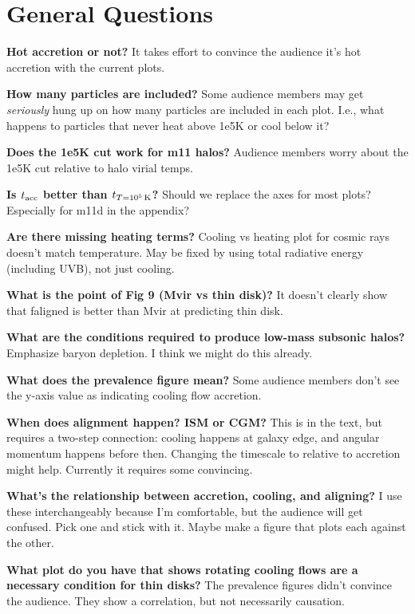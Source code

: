 

\section{General Questions}

\textbf{Hot accretion or not?}
It takes effort to convince the audience it's hot accretion with the current plots.

\textbf{How many particles are included?}
Some audience members may get \textit{seriously} hung up on how many particles are included in each plot.
I.e., what happens to particles that never heat above 1e5K or cool below it?

\textbf{Does the 1e5K cut work for m11 halos?}
Audience members worry about the 1e5K cut relative to halo virial temps.

\textbf{Is $t_{\rm acc}$ better than $t_{T=10^5\,{\rm K}}$?}
Should we replace the axes for most plots?
Especially for m11d in the appendix?

\textbf{Are there missing heating terms?}
Cooling vs heating plot for cosmic rays doesn't match temperature.
May be fixed by using total radiative energy (including UVB), not just cooling.

\textbf{What is the point of Fig 9 (Mvir vs thin disk)?}
It doesn't clearly show that faligned is better than Mvir at predicting thin disk.

\textbf{What are the conditions required to produce low-mass subsonic halos?}
Emphasize baryon depletion.
I think we might do this already.

\textbf{What does the prevalence figure mean?}
Some audience members don't see the y-axis value as indicating cooling flow accretion.

\textbf{When does alignment happen? ISM or CGM?}
This is in the text, but requires a two-step connection:
cooling happens at galaxy edge,
and angular momentum happens before then.
Changing the timescale to relative to accretion might help.
Currently it requires some convincing.

\textbf{What's the relationship between accretion, cooling, and aligning?}
I use these interchangeably because I'm comfortable, but the audience will get confused.
Pick one and stick with it.
Maybe make a figure that plots each against the other.

\textbf{What plot do you have that shows rotating cooling flows are a necessary condition for thin disks?}
The prevalence figures didn't convince the audience.
They show a correlation, but not necessarily causation.

